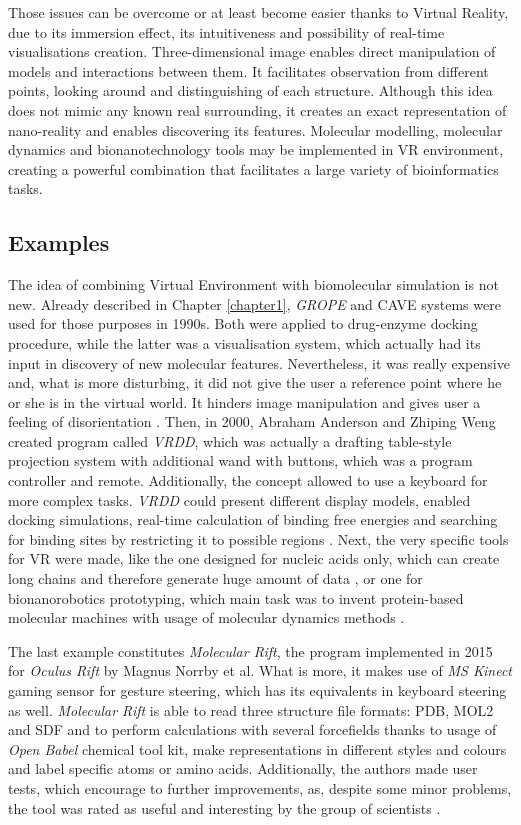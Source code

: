 Those issues can be overcome or at least become easier thanks to Virtual Reality, due to its immersion effect, its intuitiveness and possibility of real-time visualisations creation. Three-dimensional image enables direct manipulation of models and interactions between them. It facilitates observation from different points, looking around and distinguishing of each structure. Although this idea does not mimic any known real surrounding, it creates an exact representation of nano-reality and enables discovering its features. Molecular modelling, molecular dynamics and bionanotechnology tools may be implemented in VR environment, creating a powerful combination that facilitates a large variety of bioinformatics tasks.  

\subsection{Examples}

The idea of combining Virtual Environment with biomolecular simulation is not new. Already described in Chapter \ref{chapter1}, \textit{GROPE} and CAVE systems were used for those purposes in 1990s. Both were applied to drug-enzyme docking procedure, while the latter was a visualisation system, which actually had its input in discovery of new molecular features. Nevertheless, it was really expensive and, what is more disturbing, it did not give the user a reference point where he or she is in the virtual world. It hinders image manipulation and gives user a feeling of disorientation \citep{Mazuryk96, Schulze11}. Then, in 2000, Abraham Anderson and Zhiping Weng created program called \textit{VRDD}, which was actually a drafting table-style projection system with additional wand with buttons, which was a program controller and remote. Additionally, the concept allowed to use a keyboard for more complex tasks. \textit{VRDD} could present different display models, enabled docking simulations, real-time calculation of binding free energies and searching for binding sites by restricting it to possible regions \citep{Anderson99}. Next, the very specific tools for VR were made, like the one designed for nucleic acids only, which can create long chains and therefore generate huge amount of data \citep{Herisson05}, or one for bionanorobotics prototyping, which main task was to invent protein-based molecular machines with usage of molecular dynamics methods \citep{Hamdi08}.

The last example constitutes \textit{Molecular Rift}, the program implemented in 2015 for \textit{Oculus Rift} by Magnus Norrby et al. What is more, it makes use of \textit{MS Kinect} gaming sensor for gesture steering, which has its equivalents in keyboard steering as well. \textit{Molecular Rift} is able to read three structure file formats: PDB, MOL2 and SDF and to perform calculations with several forcefields thanks to usage of \textit{Open Babel} chemical tool kit, make representations in different styles and colours and label specific atoms or amino acids. Additionally, the authors made user tests, which encourage to further improvements, as, despite some minor problems, the tool was rated as useful and interesting by the group of scientists \citep{Norrby15}. 

